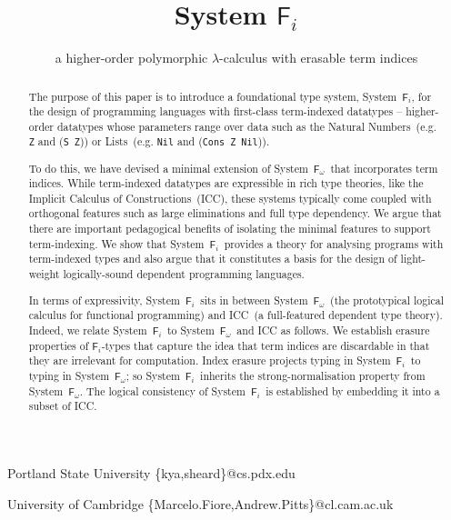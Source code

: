 \documentclass[preprint]{sigplanconf}
\newcommand{\Fi}{\ensuremath{\mathsf{F}_i}}
\newcommand{\Fw}{\ensuremath{\mathsf{F}_\omega}}
\theoremstyle{plain}
\theoremstyle{remark}
\theoremstyle{definition}
\begin{document}
\copyrightdata{[to be supplied]} 


\title{System \Fi}
\subtitle{a higher-order polymorphic $\lambda$-calculus with erasable term indices}

           {Portland State University}
	   {\{kya,sheard\}@cs.pdx.edu}

           {University of Cambridge}
	   {\{Marcelo.Fiore,Andrew.Pitts\}@cl.cam.ac.uk}

\maketitle

\begin{abstract}
The purpose of this paper is to introduce a foundational type system,
System~\Fi, for the design of programming languages with first-class
term-indexed datatypes -- higher-order datatypes whose parameters range
over data such as the Natural Numbers~(e.g. {\tt Z} and {(\tt S
Z})) or Lists~(e.g. {\tt Nil} and ({\tt Cons Z Nil})).

To do this, we have
devised a minimal extension of System~\Fw\ that incorporates term indices.
While term-indexed datatypes are expressible in rich type theories, like
the Implicit Calculus of Constructions~(ICC), these systems typically come 
coupled with
orthogonal features such as large eliminations and full type dependency.  We
argue that there are important pedagogical benefits of isolating the
minimal features to support term-indexing. We show that System~\Fi\
provides a theory for analysing programs with term-indexed types and also
argue that it constitutes a basis for the design of light-weight
logically-sound dependent programming languages.

In terms of expressivity, System~\Fi\ sits in between System~\Fw\ (the
prototypical logical calculus for functional programming) and ICC~(a
full-featured dependent type theory).  Indeed, we relate System~\Fi\ to
System~\Fw\ and ICC as follows.  We establish erasure properties of
\Fi-types that capture the idea that term indices are discardable in
that they are irrelevant for computation.  Index erasure projects typing
in System~\Fi\ to typing in System~\Fw; so System~\Fi\ inherits the
strong-normalisation property from System~\Fw.  The logical consistency of
System~\Fi\ is established by embedding it into a subset of ICC.
\end{abstract}
\end{document}

